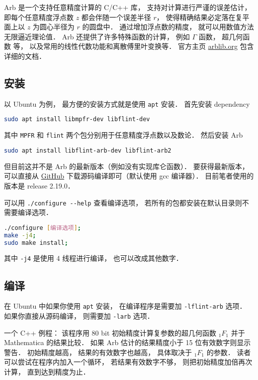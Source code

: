 

Arb 是一个支持任意精度计算的 C/C++ 库， 支持对计算进行严谨的误差估计， 即每个任意精度浮点数 $z$ 都会伴随一个误差半径 $r$， 使得精确结果必定落在复平面上以 $z$ 为圆心半径为 $r$ 的圆盘中． 通过增加浮点数的精度， 就可以用数值方法无限逼近理论值． Arb 还提供了许多特殊函数的计算， 例如 $\Gamma$ 函数， 超几何函数 等， 以及常用的线性代数功能和离散傅里叶变换等． 官方主页 \href{https://arblib.org/}{arblib.org} 包含详细的文档．

\subsection{安装}
以 Ubuntu 为例， 最方便的安装方式就是使用 \verb|apt| 安装． 首先安装 dependency
\begin{lstlisting}[language=bash]
sudo apt install libmpfr-dev libflint-dev
\end{lstlisting}
其中 \verb|MPFR| 和 \verb|flint| 两个包分别用于任意精度浮点数以及数论． 然后安装 Arb
\begin{lstlisting}[language=bash]
sudo apt install libflint-arb-dev libflint-arb2
\end{lstlisting}

但目前这并不是 Arb 的最新版本（例如没有实现库仑函数）． 要获得最新版本， 可以直接从 \href{https://github.com/fredrik-johansson/arb/}{GitHub} 下载源码编译即可（默认使用 gcc 编译器）． 目前笔者使用的版本是 release 2.19.0．

可以用 \verb|./configure --help| 查看编译选项， 若所有的包都安装在默认目录则不需要编译选项．
\begin{lstlisting}[language=bash]
./configure [编译选项];
make -j4;
sudo make install;
\end{lstlisting}
其中 \verb|-j4| 是使用 4 线程进行编译， 也可以改成其他数字．

\subsection{编译}
在 Ubuntu 中如果你使用 \verb|apt| 安装， 在编译程序是需要加 \verb|-lflint-arb| 选项． 如果你直接从源码编译， 则需要加 \verb|-larb| 选项．

一个 C++ 例程： 该程序用 80 bit 初始精度计算复参数的超几何函数 $_1F_1$ 并于 Mathematica 的结果比较． 如果 Arb 估计的结果精度小于 15 位有效数字则显示警告． 初始精度越高， 结果的有效数字也越高， 具体取决于 $_1F_1$ 的参数． 读者可以尝试在程序内加入一个循环， 若结果有效数字不够， 则把初始精度加倍再次计算， 直到达到精度为止．

